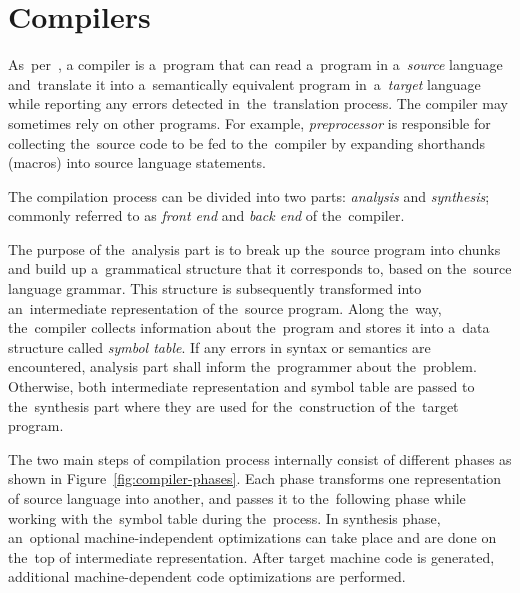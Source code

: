 \documentclass[
  digital, %
  table,   %
  lof,     %
  lot,     %
  oneside,
]{fithesis3}
\begin{document}
\chapter{Compilers}
\label{chap:compilers}
As~per~\cite{dragon-book}, a compiler is a~program that can read a~program in a~\textit{source} language and~translate it into a~semantically equivalent program in~a~\textit{target} language while reporting any errors detected in~the~translation process. The compiler may sometimes rely on other programs. For example, \textit{preprocessor} is responsible for collecting the~source code to be fed to the~compiler by expanding shorthands (macros) into source language statements. 

The compilation process can be divided into two parts: \textit{analysis} and \textit{synthesis}; commonly referred to as \textit{front end} and \textit{back end} of the~compiler.

The purpose of the~analysis part is to break up the~source program into chunks and build up a~grammatical structure that it corresponds to, based on the~source language grammar. This structure is subsequently transformed into an~intermediate representation of the~source program. Along the~way, the~compiler collects information about the~program and stores it into a~data structure called \textit{symbol table}. If any errors in syntax or semantics are encountered, analysis part shall inform the~programmer about the~problem. Otherwise, both intermediate representation and symbol table are passed to the~synthesis part where they are used for the~construction of the~target program.

The two main steps of compilation process internally consist of different phases as shown in Figure~\ref{fig:compiler-phases}. Each phase transforms one representation of source language into another, and passes it to the~following phase while working with the~symbol table during the~process. In synthesis phase, an~optional machine-independent optimizations can take place and are done on the~top of intermediate representation. After target machine code is generated, additional machine-dependent code optimizations are performed.
\end{document}
